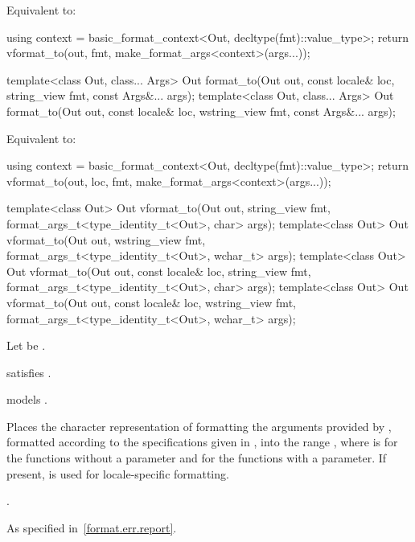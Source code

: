 \begin{itemdescr}
\pnum
\effects
Equivalent to:
\begin{codeblock}
using context = basic_format_context<Out, decltype(fmt)::value_type>;
return vformat_to(out, fmt, make_format_args<context>(args...));
\end{codeblock}
\end{itemdescr}

%
\begin{itemdecl}
template<class Out, class... Args>
  Out format_to(Out out, const locale& loc, string_view fmt, const Args&... args);
template<class Out, class... Args>
  Out format_to(Out out, const locale& loc, wstring_view fmt, const Args&... args);
\end{itemdecl}

\begin{itemdescr}
\pnum
\effects
Equivalent to:
\begin{codeblock}
using context = basic_format_context<Out, decltype(fmt)::value_type>;
return vformat_to(out, loc, fmt, make_format_args<context>(args...));
\end{codeblock}
\end{itemdescr}

%
\begin{itemdecl}
template<class Out>
  Out vformat_to(Out out, string_view fmt,
                 format_args_t<type_identity_t<Out>, char> args);
template<class Out>
  Out vformat_to(Out out, wstring_view fmt,
                 format_args_t<type_identity_t<Out>, wchar_t> args);
template<class Out>
  Out vformat_to(Out out, const locale& loc, string_view fmt,
                 format_args_t<type_identity_t<Out>, char> args);
template<class Out>
  Out vformat_to(Out out, const locale& loc, wstring_view fmt,
                 format_args_t<type_identity_t<Out>, wchar_t> args);
\end{itemdecl}

\begin{itemdescr}
\pnum
Let  be .

\pnum
\constraints
{} satisfies .

\pnum
\expects
{} models .

\pnum
\effects
Places the character representation of formatting
the arguments provided by ,
formatted according to the specifications given in ,
into the range ,
where  is
 for the functions without a  parameter and
 for the functions with a  parameter.
If present,  is used for locale-specific formatting.

\pnum
\returns
{}.

\pnum
\throws
As specified in~\ref{format.err.report}.
\end{itemdescr}

